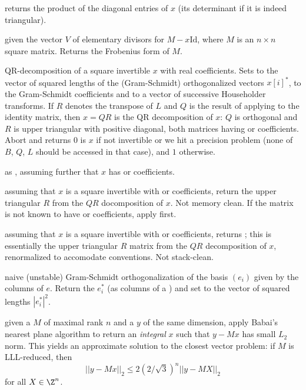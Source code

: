  returns the product of the diagonal
entries of $x$ (its determinant if it is indeed triangular).

 given the vector $V$ of elementary
divisors for $M - x\text{Id}$, where $M$ is an $n\times n$ square matrix.
Returns the Frobenius form of $M$.

QR-decomposition of a square invertible  $x$ with real coefficients.
Sets  to the vector of squared lengths of the (Gram-Schmidt)
orthogonalized vectors $x[i]^*$,  to
the Gram-Schmidt coefficients and  to a vector of successive
Householder transforms. If $R$ denotes the transpose of $L$ and $Q$ is the
result of applying  to the identity matrix, then $x = QR$ is the QR
decomposition of $x$: $Q$ is orthogonal and $R$ is upper triangular with
positive diagonal, both matrices having  or  coefficients.
Abort and returns $0$ is $x$ if not invertible or we hit a precision problem
(none of $B$, $Q$, $L$ should be accessed in that case), and $1$ otherwise.

 as
, assuming further that $x$ has  or 
coefficients.

 assuming that $x$ is a square
invertible  with  or  coefficients, return
the upper triangular $R$ from the $QR$ docomposition of $x$. Not memory
clean. If the matrix is not known to have  or 
coefficients, apply  first.

 assuming that $x$ is a square
invertible  with  or  coefficients, returns
; this is essentially the upper triangular $R$
matrix from the $QR$ decomposition of $x$, renormalized to accomodate
 conventions. Not stack-clean.

 naive (unstable) Gram-Schmidt
orthogonalization of the basis $(e_i)$ given by the columns of  $e$.
Return the $e_i^*$ (as columns of a ) and set  to the
vector of squared lengths $|e_i^*|^2$.

 given a  $M$ of maximal rank $n$
and a  $y$ of the same dimension, apply Babai's nearest plane
algorithm to return an \emph{integral} $x$ such that $y - Mx$ has small $L_2$
norm. This yields an approximate solution to the closest vector problem: if
$M$ is LLL-reduced, then
$$|| y - Mx ||_2 \leq 2 (2/\sqrt{3})^n || y - MX ||_2$$
for all $X \in \Z^n$.


